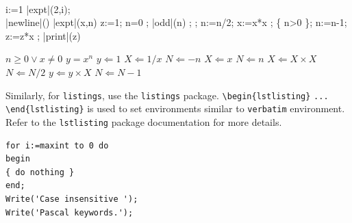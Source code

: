 \begin{program}
\BEGIN \\ %
  \FOR i:=1   \DO
     |expt|(2,i); \\ |newline|() \OD %
\WHERE
\PROC |expt|(x,n) \BODY
          z:=1;
          \DO \IF n=0 \THEN \EXIT \FI;
             \DO \IF |odd|(n) \THEN \EXIT \FI;
;
                n:=n/2; x:=x*x \OD;
             \{ n>0 \};
             n:=n-1; z:=z*x \OD;
          |print|(z) \ENDPROC
\END
\end{program}


\begin{algorithm}
\caption{Calculate $y = x^n$}\label{algo1}
\begin{algorithmic}[1]
\Require $n \geq 0 \vee x \neq 0$
\Ensure $y = x^n$ 
\State $y \Leftarrow 1$
\label{algln2}
        \State $X \Leftarrow 1 / x$
        \State $N \Leftarrow -n$
\Else
        \State $X \Leftarrow x$
        \State $N \Leftarrow n$
\EndIf
{}
            \State $X \Leftarrow X \times X$
            \State $N \Leftarrow N / 2$
        \Else[$N$ is odd]
            \State $y \Leftarrow y \times X$
            \State $N \Leftarrow N - 1$
        \EndIf
\EndWhile
\end{algorithmic}
\end{algorithm}
\bigskip

Similarly, for \verb+listings+, use the \verb+listings+ package. \verb+\begin{lstlisting}+ \verb+...+ \verb+\end{lstlisting}+ is used to set environments similar to \verb+verbatim+ environment. Refer to the \verb+lstlisting+ package documentation for more details.

\bigskip
\begin{minipage}{\hsize}%
\lstset{frame=single,framexleftmargin=-10pt,framexrightmargin=-17pt,framesep=12pt,linewidth=0.98\textwidth,language=pascal}%
\begin{lstlisting}
for i:=maxint to 0 do
begin
{ do nothing }
end;
Write('Case insensitive ');
Write('Pascal keywords.');
\end{lstlisting}
\end{minipage}

